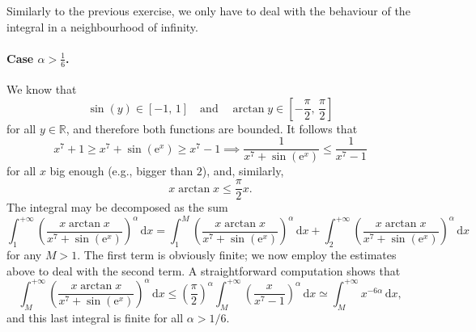 \documentclass[a4paper,10 pt]{report}
\theoremstyle{definition}
\newcommand{\R}{\mathbb R}
\begin{document}
\begin{solutionBox} Similarly to the previous exercise, we only have to deal with the behaviour of the integral in a neighbourhood of infinity.

\paragraph{Case $\alpha > \frac{1}{6}$.} We know that
\begin{equation*} \sin(y) \in [-1, \, 1] \quad \text{and} \quad \arctan y \in [- \frac{\pi}{2}, \, \frac{\pi}{2}] \end{equation*}
for all $y \in \R$, and therefore both functions are bounded. It follows that
\begin{equation*} x^7 + 1 \geq x^7 + \sin( \mathrm{e}^x ) \geq x^7 - 1 \implies \frac{1}{x^7 + \sin(\mathrm{e}^x)} \leq \frac{1}{x^7 - 1} \end{equation*}
for all $x$ big enough (e.g., bigger than $2$), and, similarly,
\begin{equation*} x \arctan x \leq \frac{\pi}{2} x.\end{equation*}
The integral may be decomposed as the sum
\begin{equation*} \int_1^{+ \infty} \left( \frac{x \arctan x}{x^7 + \sin( \mathrm{e}^x )} \right)^{\alpha} \, \mathrm{d}x = \int_1^M \left( \frac{x \arctan x}{x^7 + \sin( \mathrm{e}^x )} \right)^{\alpha} \, \mathrm{d}x + \int_2^{+ \infty} \left( \frac{x \arctan x}{x^7 + \sin( \mathrm{e}^x )} \right)^{\alpha} \, \mathrm{d}x \end{equation*}
for any $M > 1$. The first term is obviously finite; we now employ the estimates above to deal with the second term. A straightforward computation shows that
\begin{equation*}\int_M^{+ \infty} \left( \frac{x \arctan x}{x^7 + \sin( \mathrm{e}^x )} \right)^{\alpha} \, \mathrm{d}x \leq \left(\frac{\pi}{2} \right)^\alpha \int_M^{+ \infty} \left( \frac{x}{x^7 - 1} \right)^\alpha \, \mathrm{d}x \simeq \int_M^{+ \infty} x^{-6 \alpha} \, \mathrm{d}x, \end{equation*}
and this last integral is finite for all $\alpha > 1/6$.


\end{solutionBox}
\end{document}
